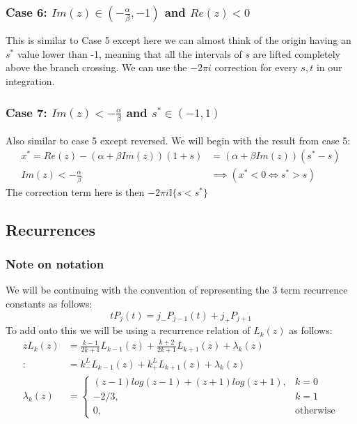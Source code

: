 \documentclass{article}
\begin{document}
\subsubsection{Case 6: $Im(z)\in(-\frac{\alpha}{\beta},-1)$ and $Re(z)<0$}
This is similar to Case 5 except here we can almost think of the origin having an $s^*$ value lower than -1, meaning that all the intervals of $s$ are lifted completely above the branch crossing.
We can use the $-2\pi i$ correction for every $s,t$ in our integration.

\subsubsection{Case 7: $Im(z)<-\frac{\alpha}{\beta}$ and $s^*\in(-1,1)$}
Also similar to case 5 except reversed.
We will begin with the result from case 5:
\begin{align}
    x^*=Re(z)-(\alpha+\beta Im(z))(1+s)&=(\alpha+\beta Im(z))(s^*-s)\\
    Im(z)<-\frac{\alpha}{\beta}&\implies (x^*<0 \iff s^*>s)
\end{align}
The correction term here is then $-2\pi i\mathbb{I}\{s<s^*\}$

\subsection{Recurrences}
\subsubsection{Note on notation}
We will be continuing with the convention of representing the 3 term recurrence constants as follows:
$$tP_j(t)=j_-P_{j-1}(t)+j_+P_{j+1}$$
To add onto this we will be using a recurrence relation of $L_k(z)$ as follows:
\begin{align}
    zL_k(z) &= \frac{k-1}{2k+1}L_{k-1}(z)+\frac{k+2}{2k+1}L_{k+1}(z)+\lambda_k(z)\\
    :&= k_-^LL_{k-1}(z)+k_+^LL_{k+1}(z)+\lambda_k(z)\\
    \lambda_k(z) &= \begin{cases}
	(z-1)log(z-1)+(z+1)log(z+1),&k=0\\
	-2/3,&k=1\\
	0,&\text{otherwise}
    \end{cases}
\end{align}
\end{document}
